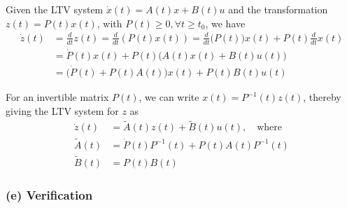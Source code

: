 Given the LTV system \( \dot{x}(t)=A(t) x+B(t) u \) and the transformation \( z(t)=P(t) x(t) \), with \( P(t) \geq 0, \forall t \geq t_{0} \), we have
\begin{align*}
    \dot{z}(t)
     & =
    \frac{d}{dt} z(t)
    =
    \frac{d}{dt} (P(t) x(t))
    =
    \frac{d}{dt} \Big(P(t)\Big) x(t) + P(t) \frac{d}{dt} x(t)
    \\
     & =
    \dot{P}(t) x(t) + P(t) \Big( A(t) x(t) + B(t) u(t) \Big)
    \\ & =
    \Big( \dot{P}(t) + P(t) A(t) \Big) x(t) + P(t) B(t) u(t)
\end{align*}

For an invertible matrix \( P(t) \), we can write \( x(t) = P^{-1}(t) z(t) \), thereby giving the LTV system for \( z \) as
\[
    \boxed{
        \begin{aligned}
            \dot{z}(t)
             & =
            \tilde{A}(t) z(t) + \tilde{B}(t) u(t), \quad \text{where}
            \\
            \tilde{A}(t)
             & =
            \dot{P}(t) P^{-1}(t) + P(t) A(t) P^{-1}(t)
            \\
            \tilde{B}(t)
             & =
            P(t) B(t)
        \end{aligned}
    }
\]

\subsubsection*{(e) Verification}


